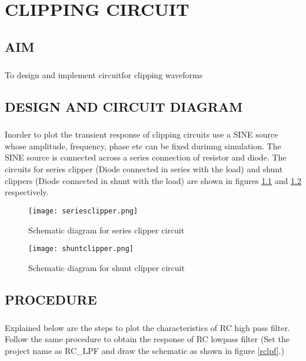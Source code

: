 \chapter{CLIPPING CIRCUIT}

\section*{AIM}
\paragraph{}To design and implement circuitfor clipping waveforms
\section*{DESIGN AND CIRCUIT DIAGRAM}
\paragraph{}

Inorder to plot the transient response of clipping circuits use a SINE source whose amplitude, frequency, phase etc can be fixed durinmg simulation. The SINE source is connected across a series connection of resistor and diode. The circuits for series clipper (Diode connected in series with the load) and shunt clippers (Diode connected in shunt with the load)  are shown in figures \ref{seriesclipper} and  \ref{shuntclipper} respectively. 


\begin{figure}[h]
\centering
\texttt{[image: seriesclipper.png]}
\caption{Schematic diagram for series clipper circuit}
\label{seriesclipper}
\end{figure}

\begin{figure}[h]
\centering
\texttt{[image: shuntclipper.png]}
\caption{Schematic diagram for shunt clipper circuit}
\label{shuntclipper}
\end{figure}

\section*{PROCEDURE}

\paragraph{}Explained below are the steps to plot the characteristics of RC high pass filter. Follow the same procedure to obtain the response of RC lowpass filter (Set the project name as RC\_LPF and draw the schematic as shown in figure \ref{rclpf}.)


